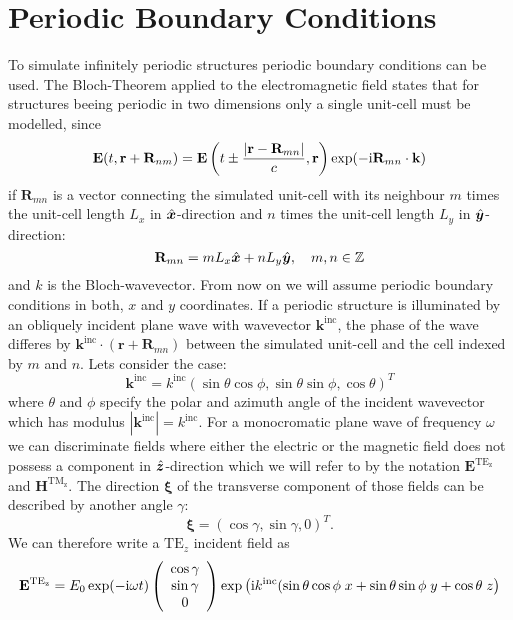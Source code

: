 \section{Periodic Boundary Conditions}
To simulate infinitely periodic structures periodic boundary conditions can be used. The Bloch-Theorem applied to the electromagnetic field states that for structures beeing periodic in two dimensions only a single unit-cell must be modelled, since 
\begin{equation}
\mathbf{E}(t,\mathbf{r}+\mathbf{R}_{nm}) =  \mathbf{E}\left(t\pm\frac{|\mathbf{r}-\mathbf{R}_{mn}|}{c}, \mathbf{r}\right) \exp(-\mathrm{i} \mathbf{R}_{mn}\cdot \mathbf{k})
\end{equation}
if $\mathbf{R}_{mn}$ is a vector connecting the simulated unit-cell with its neighbour $m$ times the unit-cell length $L_x$ in $\hat{\bm{x}}$-direction and $n$ times the unit-cell length $L_y$ in $\hat{\bm{y}}$-direction:
\begin{equation}
\mathbf{R}_{mn} = m L_x \hat{\bm{x}} + n L_y \hat{\bm{y}},\quad m,n\in \mathbb{Z}
\end{equation}
and $k$ is the Bloch-wavevector. From now on we will assume periodic boundary conditions in both, $x$ and $y$ coordinates. If a periodic structure is illuminated by an obliquely incident plane wave with wavevector $\mathbf{k}^\mathrm{inc}$, the phase of the wave differes by $\mathbf{k}^\mathrm{inc}\cdot (\mathbf{r}+\mathbf{R}_{mn})$ between the simulated unit-cell and the cell indexed by $m$ and $n$. Lets consider the case:
\begin{equation}
\mathbf{k}^\mathrm{inc} = k^\mathrm{inc}\left(\sin\theta\cos\phi, \sin\theta\sin\phi,\cos\theta\right)^T
\end{equation}
where $\theta$ and $\phi$ specify the polar and azimuth angle of the incident wavevector which has modulus $|\mathbf{k}^\mathrm{inc}|=k^\mathrm{inc}$. For a monocromatic plane wave of frequency $\omega$ we can discriminate fields where either the electric or the magnetic field does not possess a component in $\hat{\bm{z}}$-direction which we will refer to by the notation $\mathbf{E}^\mathrm{TE_z}$ and $\mathbf{H}^\mathrm{TM_z}$. The direction $\bm{\xi}$ of the transverse component of those fields can be described by another angle $\gamma$:
\begin{equation}
\bm{\xi} = \left(\cos\gamma, \sin\gamma, 0 \right)^T.
\end{equation}
We can therefore write a $\mathrm{TE}_z$ incident field as
\begin{equation}
\mathbf{E}^\mathrm{TE_z} = E_0 \exp(-\mathrm{i} \omega t)
\left(
\begin{array}{c}
\cos\gamma \\ \sin\gamma \\ 0
\end{array}\right)
\exp\big(\mathrm{i} k^\mathrm{inc} (\sin\theta\cos\phi\; x + \sin\theta\sin\phi\; y + \cos\theta\; z\big)
\end{equation}
